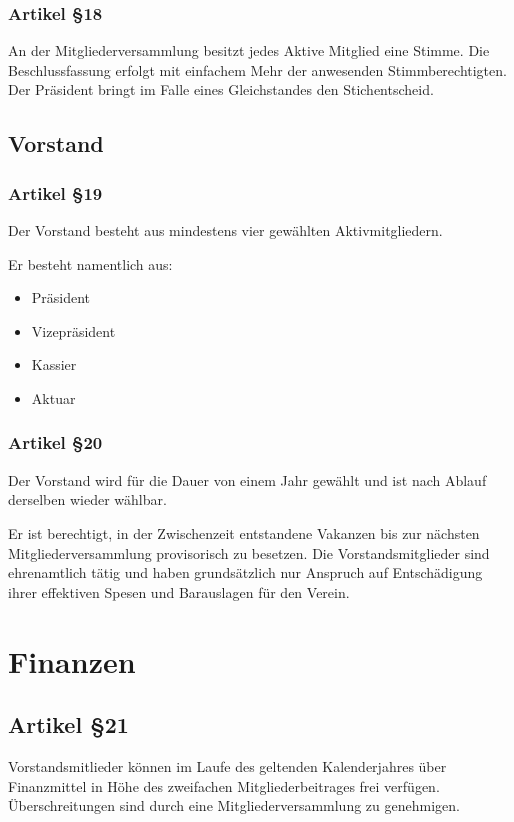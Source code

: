 \documentclass[a4paper,10pt,fleqn]{article}
\begin{document}
\subsubsection*{Artikel §18}
An der Mitgliederversammlung besitzt jedes Aktive Mitglied 
eine Stimme. Die Beschlussfassung erfolgt mit einfachem Mehr
der anwesenden Stimmberechtigten. 
Der Präsident bringt im Falle eines Gleichstandes den 
Stichentscheid.

\subsection{Vorstand}

\subsubsection*{Artikel §19}
Der Vorstand besteht aus mindestens vier gewählten 
Aktivmitgliedern.

Er besteht namentlich aus:
\begin{itemize}
\item Präsident
\item Vizepräsident
\item Kassier
\item Aktuar
\end{itemize}
 
\subsubsection*{Artikel §20}
Der Vorstand wird für die Dauer von einem Jahr gewählt und 
ist nach Ablauf derselben wieder wählbar.

Er ist berechtigt, in der Zwischenzeit entstandene Vakanzen 
bis zur nächsten Mitgliederversammlung provisorisch zu
besetzen. Die Vorstandsmitglieder sind ehrenamtlich tätig
und haben grundsätzlich nur Anspruch auf Entschädigung ihrer
effektiven Spesen und Barauslagen für den Verein.

\section{Finanzen}

\subsection*{Artikel §21}
Vorstandsmitlieder können im Laufe des geltenden 
Kalenderjahres über Finanzmittel in Höhe des zweifachen
Mitgliederbeitrages frei verfügen. Überschreitungen sind
durch eine Mitgliederversammlung zu genehmigen.
\end{document}
